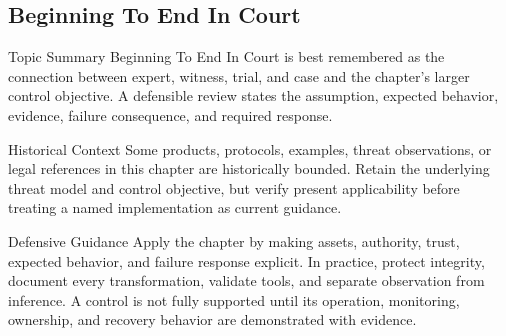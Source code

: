 \documentclass[11pt,letterpaper]{article}
\begin{document}
\subsection*{Beginning To End In Court}
\begin{CornellNotesTable}
\end{CornellNotesTable}
\begin{CornellSummaryBox}{Topic Summary}
Beginning To End In Court is best remembered as the connection between expert, witness, trial, and case and the chapter's larger control objective. A defensible review states the assumption, expected behavior, evidence, failure consequence, and required response.
\end{CornellSummaryBox}
\begin{CornellWarningBox}{Historical Context}
Some products, protocols, examples, threat observations, or legal references in this chapter are historically bounded. Retain the underlying threat model and control objective, but verify present applicability before treating a named implementation as current guidance.
\end{CornellWarningBox}
\begin{CornellOverviewBox}{Defensive Guidance}
Apply the chapter by making assets, authority, trust, expected behavior, and failure response explicit. In practice, protect integrity, document every transformation, validate tools, and separate observation from inference. A control is not fully supported until its operation, monitoring, ownership, and recovery behavior are demonstrated with evidence.
\end{CornellOverviewBox}
\end{document}
